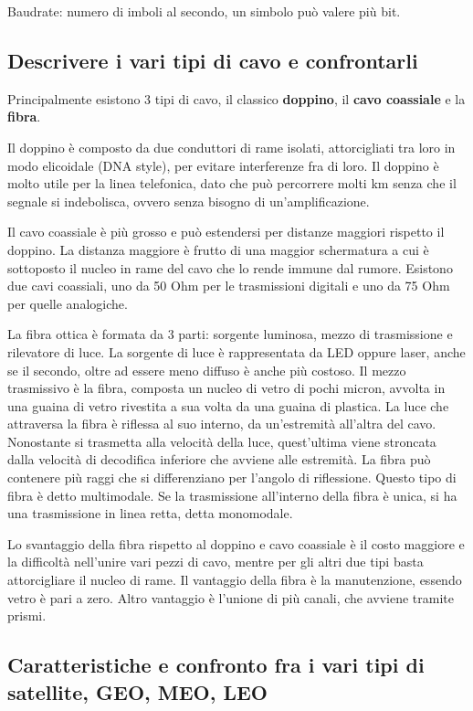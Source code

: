 Baudrate: numero di imboli al secondo, un simbolo può valere più bit.


\subsection{Descrivere i vari tipi di cavo e confrontarli}

Principalmente esistono 3 tipi di cavo, il classico \textbf{doppino}, il \textbf{cavo coassiale} e la \textbf{fibra}.

Il doppino è composto da due conduttori di rame isolati, attorcigliati tra loro in modo
elicoidale (DNA style), per evitare interferenze fra di loro. Il doppino è molto utile per la linea
telefonica, dato che può percorrere molti km senza che il segnale si indebolisca, ovvero senza
bisogno di un'amplificazione.

Il cavo coassiale è più grosso e può estendersi per distanze maggiori rispetto il doppino. La distanza
maggiore è frutto di una maggior schermatura a cui è sottoposto il nucleo in rame del cavo che lo
rende immune dal rumore. Esistono due cavi coassiali, uno da 50 Ohm per le trasmissioni digitali e
uno da 75 Ohm per quelle analogiche.

La fibra ottica è formata da 3 parti: sorgente luminosa, mezzo di trasmissione e rilevatore di luce. La
sorgente di luce è rappresentata da LED oppure laser, anche se il secondo, oltre ad essere meno
diffuso è anche più costoso. Il mezzo trasmissivo è la fibra, composta un nucleo di vetro di pochi
micron, avvolta in una guaina di vetro rivestita a sua volta da una guaina di plastica. La luce che
attraversa la fibra è riflessa al suo interno, da un'estremità all'altra del cavo. Nonostante si
trasmetta alla velocità della luce, quest’ultima viene stroncata dalla velocità di decodifica inferiore
che avviene alle estremità. La fibra può contenere più raggi che si differenziano per l'angolo di riflessione. Questo tipo di fibra è detto multimodale. Se la trasmissione all'interno della fibra è
unica, si ha una trasmissione in linea retta, detta monomodale.

Lo svantaggio della fibra rispetto al doppino e cavo coassiale è il costo maggiore e la difficoltà
nell'unire vari pezzi di cavo, mentre per gli altri due tipi basta attorcigliare il nucleo di rame. Il
vantaggio della fibra è la manutenzione, essendo vetro è pari a zero. Altro vantaggio è l'unione di
più canali, che avviene tramite prismi.

\subsection{Caratteristiche e confronto fra i vari tipi di satellite, GEO, MEO, LEO}

